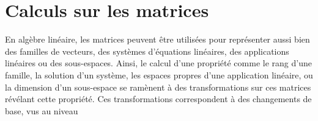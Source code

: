\section{ Calculs sur les matrices}
En algèbre linéaire, les matrices peuvent être utilisées pour représenter aussi bien des familles de vecteurs, 
des systèmes d’équations linéaires, des applications linéaires ou des sous-espaces. Ainsi, le calcul d’une 
propriété comme le rang d’une famille, la solution d’un système, les espaces propres d’une application linéaire, 
ou la dimension d’un sous-espace se ramènent à des transformations sur ces matrices révélant cette propriété. 
Ces transformations correspondent à des changements de base, vus au niveau




